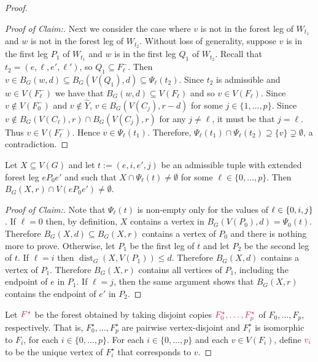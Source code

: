 \documentclass{patmorin}
\newcommand{\pat}[1]{\textcolor{Blue}{[Pat: #1]}}
\newcommand{\gwen}[1]{\textcolor{Purple}{Gwen: #1}}
\newenvironment{clmproof}{\begin{proof}[Proof of Claim:]\renewcommand{\qedsymbol}{\rule{1ex}{1ex}}}{\end{proof}}
\DeclareMathOperator{\dist}{dist}
\DeclarePairedDelimiter\set{\{}{\}}
\begin{document}
\begin{proof}
\begin{clmproof}
  Next we consider the case where $v$ is not in the forest leg of $W_{t_1}$ and $w$ is not in the forest leg of $W_{t_2}$.  Without loss of generality, suppose $v$ is in the first leg $P_1$ of $W_{t_1}$ and $w$ is in the first leg $Q_1$ of $W_{t_2}$.
  Recall that $t_2=(e,\ell,e',\ell')$, so $Q_1\subseteq F_\ell^-$.
  Then $v\in B_G(w,d)\subseteq B_G(V(Q_1),d) \subseteq \Psi_\ell(t_2)$.
  Since $t_2$ is admissible and $w\in V(F^-_\ell)$ we have that $B_G(w,d) \subseteq V(F_\ell)$ and so $v\in V(F_\ell)$.
  Since $v\not\in V(F_0^-)$ and $v\not\in \widehat{Y}$,
  $v\in B_G(V(C_j),r-d)$ for some $j\in\{1,\ldots,p\}$.
  Since $v\notin B_G(V(C_\ell),r)\cap B_G(V(C_j),r)$ for any $j\neq \ell$, it must be that $j=\ell$. Thus $v\in V(F^-_\ell)$.  Hence $v\in\Psi_\ell(t_1)$.
  Therefore, $\Psi_\ell(t_1)\cap\Psi_\ell(t_2)\supseteq\{v\}\supsetneq \emptyset$, a contradiction.
\end{clmproof}


\begin{clm}\label{hungarians_hit}
  Let $X\subseteq V(G)$ and let $t:=(e,i,e',j)$ be an admissible tuple with extended forest leg $eP_0e'$ and such that $X\cap \Psi_\ell(t)\neq\emptyset$ for some $\ell\in\{0,\ldots,p\}$.  Then $B_G(X,r)\cap V(eP_0e')\neq\emptyset$.
\end{clm}

\begin{clmproof}
  Note that $\Psi_{\ell}(t)$ is non-empty only for the values of $\ell\in\set{0,i,j}$.
  If $\ell=0$ then, by definition, $X$ contains a vertex in $B_G(V(P_0),d)=\Psi_0(t)$.  Therefore $B_G(X,d)\subseteq B_G(X,r)$ contains a vertex of $P_0$ and there is nothing more to prove.
  Otherwise, let $P_1$ be the first leg of $t$ and let $P_2$ be the second leg of $t$.
  If $\ell=i$ then $\dist_G(X,V(P_1))\le d$.  Therefore $B_G(X,d)$ contains a vertex of $P_1$.  Therefore $B_G(X,r)$ contains all vertices of $P_1$, including the endpoint of $e$ in $P_1$.  If $\ell=j$, then the same argument shows that $B_G(X,r)$ contains the endpoint of $e'$ in $P_2$.
\end{clmproof}

Let $\mathdefin{F^{\star}}$ be the forest obtained by taking
disjoint copies $\mathdefin{F_0^\star,\ldots, F_p^\star}$ of $F_0,\ldots, F_p$, respectively.  That is,  $F_0^\star,\ldots, F_p^\star$ are pairwise vertex-disjoint and $F_i^\star$ is isomorphic to $F_i$, for each $i\in\{0,\ldots,p\}$.
For each $i\in\{0,\ldots,p\}$ and each $v\in V(F_i)$, define $\mathdefin{v_i}$ to be the unique vertex of $F^\star_i$ that corresponds to $v$.


\end{proof}
\end{document}
